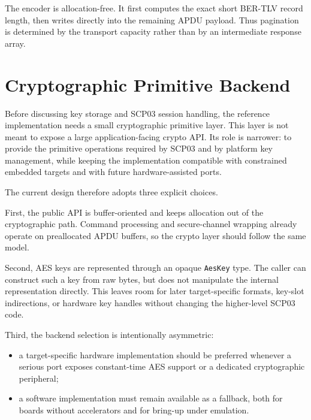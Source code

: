 The encoder is allocation-free. It first computes the exact short BER-TLV
record length, then writes directly into the remaining APDU payload. Thus
pagination is determined by the transport capacity rather than by an
intermediate response array.

\section{Cryptographic Primitive Backend}
\label{sec:impl-crypto-backend}

Before discussing key storage and SCP03 session handling, the reference
implementation needs a small cryptographic primitive layer. This layer is not
meant to expose a large application-facing crypto API. Its role is narrower:
to provide the primitive operations required by SCP03 and by platform key
management, while keeping the implementation compatible with constrained
embedded targets and with future hardware-assisted ports.

The current design therefore adopts three explicit choices.

First, the public API is buffer-oriented and keeps allocation out of the
cryptographic path. Command processing and secure-channel wrapping already
operate on preallocated APDU buffers, so the crypto layer should follow the
same model.

Second, AES keys are represented through an opaque \texttt{AesKey} type. The
caller can construct such a key from raw bytes, but does not manipulate the
internal representation directly. This leaves room for later target-specific
formats, key-slot indirections, or hardware key handles without changing the
higher-level SCP03 code.

Third, the backend selection is intentionally asymmetric:
\begin{itemize}
\item a target-specific hardware implementation should be preferred whenever a
  serious port exposes constant-time AES support or a dedicated cryptographic
  peripheral;
\item a software implementation must remain available as a fallback, both for
  boards without accelerators and for bring-up under emulation.
\end{itemize}

